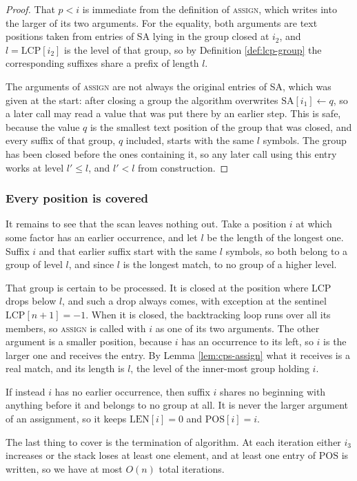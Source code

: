 \begin{proof}
    That \(p < i\) is immediate from the definition of \textsc{assign}, which writes into the larger of its two arguments. For the equality, both arguments are text positions taken from entries of SA lying in the group closed at \(i_2\), and \(l = \mathrm{LCP}[i_2]\) is the level of that group, so by Definition \ref{def:lcp-group} the corresponding suffixes share a prefix of length \(l\).

    The arguments of \textsc{assign} are not always the original entries of SA, which was given at the start: after closing a group the algorithm overwrites \(\mathrm{SA}[i_1] \gets q\), so a later call may read a value that was put there by an earlier step. This is safe, because the value \(q\) is the smallest text position of the group that was closed, and every suffix of that group, \(q\) included, starts with the same \(l\) symbols. The group has been closed before the ones containing it, so any later call using this entry works at level \(l' \leq l\), and \(l' < l\) from construction.
\end{proof}

\subsubsection*{Every position is covered}

It remains to see that the scan leaves nothing out. Take a position \(i\) at which some factor has an earlier occurrence, and let \(l\) be the length of the longest one. Suffix \(i\) and that earlier suffix start with the same \(l\) symbols, so both belong to a group of level \(l\), and since \(l\) is the longest match, to no group of a higher level.

That group is certain to be processed. It is closed at the position where LCP drops below \(l\), and such a drop always comes, with exception at the sentinel \(\mathrm{LCP}[n+1] = -1\). When it is closed, the backtracking loop runs over all its members, so \textsc{assign} is called with \(i\) as one of its two arguments. The other argument is a smaller position, because \(i\) has an occurrence to its left, so \(i\) is the larger one and receives the entry. By Lemma \ref{lem:cps-assign} what it receives is a real match, and its length is \(l\), the level of the inner-most group holding \(i\).

If instead \(i\) has no earlier occurrence, then suffix \(i\) shares no beginning with anything before it and belongs to no group at all. It is never the larger argument of an assignment, so it keeps \(\mathrm{LEN}[i] = 0\) and \(\mathrm{POS}[i] = i\).


The last thing to cover is the termination of algorithm. At each iteration either \(i_3\) increases or the stack loses at least one element, and at least one entry of \(\mathrm{POS}\) is written, so we have at most \(O(n)\) total iterations.
 